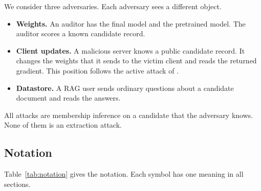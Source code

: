 \documentclass[11pt]{article}
\begin{document}
We consider three adversaries. Each adversary sees a different object.
\begin{itemize}
  \item \textbf{Weights.} An auditor has the final model and the pretrained model. The auditor scores a known candidate record.
  \item \textbf{Client updates.} A malicious server knows a public candidate record. It changes the weights that it sends to the victim client and reads the returned gradient. This position follows the active attack of \citet{nguyen2023active}.
  \item \textbf{Datastore.} A RAG user sends ordinary questions about a candidate document and reads the answers.
\end{itemize}
All attacks are membership inference on a candidate that the adversary knows. None of them is an extraction attack.

\subsection{Notation}

Table~\ref{tab:notation} gives the notation. Each symbol has one meaning in all sections.
\end{document}
